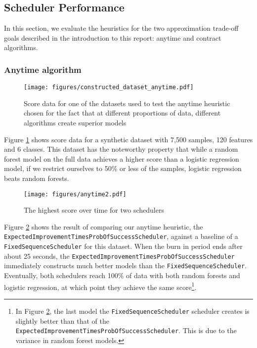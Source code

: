 \documentclass[a4paper,12pt,twoside,openright]{report}
\begin{document}
\subsection{Scheduler Performance}
In this section, we evaluate the heuristics for the two approximation trade-off goals described in the introduction to this report: anytime and contract algorithms.


\subsubsection{Anytime algorithm}

\begin{figure}[h]
\centering
  \texttt{[image: figures/constructed\_dataset\_anytime.pdf]}
  \caption{Score data for one of the datasets used to test the anytime heuristic chosen for the fact that at different proportions of data, different algorithms create superior models}
  \label{constructed_dataset_anytime}
\end{figure}

Figure \ref{constructed_dataset_anytime} shows score data for a synthetic dataset with 7,500 samples, 120 features and 6 classes. This dataset has the noteworthy property that while a random forest model on the full data achieves a higher score than a logistic regression model, if we restrict ourselves to 50\% or less of the samples, logistic regression beats random forests.


\begin{figure}
\centering
  \texttt{[image: figures/anytime2.pdf]}
  \caption{The highest score over time for two schedulers}
  \label{anytime2}
\end{figure}



Figure \ref{anytime2} shows the result of comparing our anytime heuristic, the \texttt{Expected\-Improvement\-Times\-Prob\-OfSuccessScheduler}, against a baseline of a \texttt{Fixed\-Sequence\-Scheduler} for this dataset. When the burn in period ends after about 25 seconds, the \texttt{Expected\-ImprovementTimesProbOfSuccessScheduler} immediately constructs much better models than the \texttt{Fixed\-Sequence\-Scheduler}. Eventually, both schedulers reach 100\% of data with both random forests and logistic regression, at which point they achieve the same score\footnote{In Figure \ref{anytime2}, the last model the \texttt{FixedSequence\-Scheduler} scheduler creates is slightly better than that of the \texttt{Expected\-Improvement\-Times\-Prob\-Of\-Success\-Scheduler}. This is due to the variance in random forest models.}.
\end{document}
